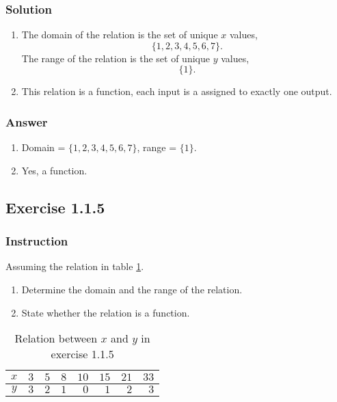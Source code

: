 \documentclass[11pt, letterpaper, oneside]{memoir}
\begin{document}
\subsubsection{Solution}

\begin{enumerate}[label=(\alph*)]
  \item The domain of the relation is the set of unique $ x $ values,
    $$ \phantom{.}
    \{ 1, 2, 3, 4, 5, 6, 7 \}
    .$$
    The range of the relation is the set of unique $ y $ values,
    $$ \phantom{.}
    \{ 1 \}
    .$$
  \item This relation is a function, each input is a assigned to exactly one output.
\end{enumerate}

\subsubsection{Answer}

\begin{enumerate}[label=(\alph*)]
  \item Domain = $  \{ 1, 2, 3, 4, 5, 6, 7 \} $, range = $ \{ 1 \} $.
  \item Yes, a function.
\end{enumerate}

\subsection*{Exercise 1.1.5}

\subsubsection{Instruction}

Assuming the relation in table \ref{table:exercise-1.1.5}.
\begin{enumerate}[label=(\alph*)]
  \item Determine the domain and the range of the relation.
  \item State whether the relation is a function.
\end{enumerate}

\begin{table}[ht]
  \centering
  \begin{tabular}{ c | r r r r r r r }
    \hline
    $ x $ & $ 3 $ & $ 5 $ & $ 8 $ & $ 10 $ & $ 15 $ & $ 21 $ & $ 33 $ \\
    \hline
    $ y $ & $ 3 $ & $ 2 $ & $ 1 $ & $ 0 $ & $ 1 $ & $ 2 $ & $ 3 $ \\
    \hline
  \end{tabular}
  \caption{Relation between $ x $ and $ y $ in exercise 1.1.5}
  \label{table:exercise-1.1.5}
\end{table}
\end{document}
